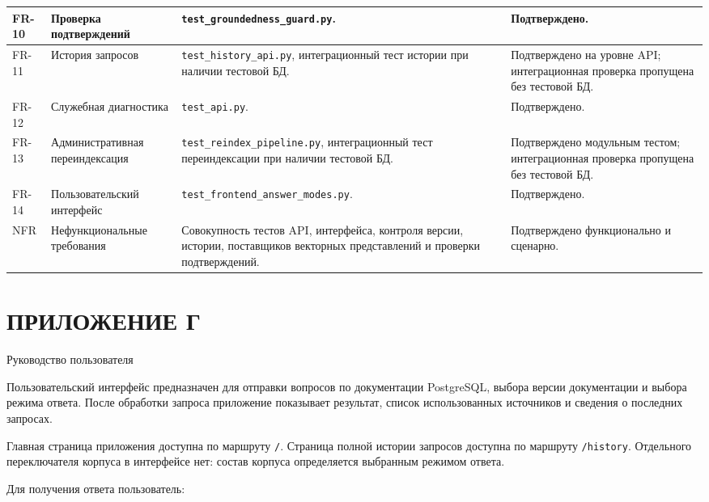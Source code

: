 \begin{longtable}{|P{0.09\textwidth}|P{0.23\textwidth}|P{0.39\textwidth}|P{0.19\textwidth}|}
FR-10 & Проверка подтверждений & \texttt{test\_groundedness\_guard.py}. & Подтверждено. \\ \hline
FR-11 & История запросов & \texttt{test\_history\_api.py}, интеграционный тест истории при наличии тестовой БД. & Подтверждено на уровне API; интеграционная проверка пропущена без тестовой БД. \\ \hline
FR-12 & Служебная диагностика & \texttt{test\_api.py}. & Подтверждено. \\ \hline
FR-13 & Административная переиндексация & \texttt{test\_reindex\_pipeline.py}, интеграционный тест переиндексации при наличии тестовой БД. & Подтверждено модульным тестом; интеграционная проверка пропущена без тестовой БД. \\ \hline
FR-14 & Пользовательский интерфейс & \texttt{test\_frontend\_answer\_modes.py}. & Подтверждено. \\ \hline
NFR & Нефункциональные требования & Совокупность тестов API, интерфейса, контроля версии, истории, поставщиков векторных представлений и проверки подтверждений. & Подтверждено функционально и сценарно. \\ \hline
\end{longtable}
\par\endgroup

\chapter[ПРИЛОЖЕНИЕ Г]{{\fontsize{14pt}{21pt}\selectfont\MakeUppercase{ПРИЛОЖЕНИЕ Г}}}
\label{cha:appendix-user-guide}
\begin{center}
{\normalfont\fontsize{14pt}{21pt}\selectfont Руководство пользователя}
\end{center}


Пользовательский интерфейс предназначен для отправки вопросов по документации PostgreSQL, выбора версии документации и выбора режима ответа. После обработки запроса приложение показывает результат, список использованных источников и сведения о последних запросах.

Главная страница приложения доступна по маршруту \texttt{/}. Страница полной истории запросов доступна по маршруту \texttt{/history}. Отдельного переключателя корпуса в интерфейсе нет: состав корпуса определяется выбранным режимом ответа.


Для получения ответа пользователь:

